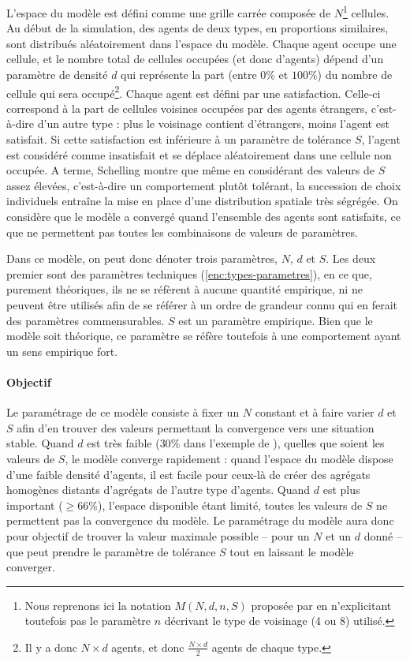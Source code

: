 \documentclass[12pt, a4paper, oneside]{book}
\begin{document}
	L'espace du modèle est défini comme une grille carrée composée de $N$\footnote{Nous reprenons ici la notation $M(N, d, n, S)$ proposée par \autocite[433]{daude_comparaison_2006} en n'explicitant toutefois pas le paramètre $n$ décrivant le type de voisinage (4 ou 8) utilisé.} cellules.
	Au début de la simulation, des agents de deux types, en proportions similaires, sont distribués aléatoirement dans l'espace du modèle. Chaque agent occupe une cellule, et le nombre total de cellules occupées (et donc d'agents) dépend d'un paramètre de densité $d$ qui représente la part (entre $0\%$ et $100\%$) du nombre de cellule qui sera occupé\footnote{Il y a donc $N \times d$ agents, et donc $\frac{N \times d}{2}$ agents de chaque type.}.
	Chaque agent est défini par une satisfaction. Celle-ci correspond à la part de cellules voisines occupées par des agents \og étrangers\fg{}, c'est-à-dire d'un autre type : plus le voisinage contient d'étrangers, moins l'agent est satisfait.
	Si cette satisfaction est inférieure à un paramètre de tolérance $S$, l'agent est considéré comme insatisfait et se déplace aléatoirement dans une cellule non occupée.
	A terme, Schelling montre que même en considérant des valeurs de $S$ assez élevées, c'est-à-dire un comportement plutôt tolérant, la succession de choix individuels entraîne la mise en place d'une distribution spatiale très ségrégée.
	On considère que le modèle a convergé quand l'ensemble des agents sont satisfaits, ce que ne permettent pas toutes les combinaisons de valeurs de paramètres.
	
	Dans ce modèle, on peut donc dénoter trois paramètres, $N$, $d$ et $S$. Les deux premier sont des paramètres techniques (\cref{enc:types-parametres}), en ce que, purement théoriques, ils ne se réfèrent à aucune quantité empirique, ni ne peuvent être utilisés afin de se référer à un ordre de grandeur connu qui en ferait des paramètres commensurables. $S$ est un paramètre empirique. Bien que le modèle soit théorique, ce paramètre se réfère toutefois à une comportement ayant un sens empirique fort.
	
	\paragraph{Objectif} Le paramétrage de ce modèle consiste à fixer un $N$ constant et à faire varier $d$ et $S$ afin d'en trouver des valeurs permettant la convergence vers une situation stable. Quand $d$ est très faible ($30\%$ dans l'exemple de \autocite{daude_comparaison_2006}), quelles que soient les valeurs de $S$, le modèle converge rapidement : quand l'espace du modèle dispose d'une faible densité d'agents, il est facile pour ceux-là de créer des agrégats homogènes distants d'agrégats de l'autre type d'agents. Quand $d$ est plus important ($\geq66\%$), l'espace disponible étant limité, toutes les valeurs de $S$ ne permettent pas la convergence du modèle. Le paramétrage du modèle aura donc pour objectif de trouver la valeur maximale possible -- pour un $N$ et un $d$ donné -- que peut prendre le paramètre de tolérance $S$ tout en laissant le modèle converger.
	
\end{document}

